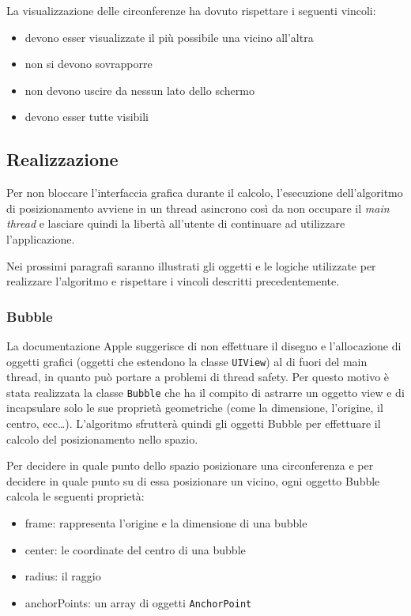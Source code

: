 La visualizzazione delle circonferenze ha dovuto rispettare i seguenti vincoli:

\begin{itemize}
 \item  devono esser visualizzate il più possibile una vicino all'altra
 \item  non si devono sovrapporre
 \item  non  devono uscire da nessun lato dello schermo 
 \item 	devono esser tutte visibili
\end{itemize}

\subsection{Realizzazione}

Per non bloccare l'interfaccia grafica durante il calcolo, l'esecuzione dell'algoritmo di posizionamento avviene in un thread asincrono così da non occupare il \emph{main thread} e lasciare quindi la libertà all'utente di continuare ad utilizzare l'applicazione.

Nei prossimi paragrafi saranno illustrati gli oggetti e le logiche utilizzate per realizzare l'algoritmo e rispettare i vincoli descritti precedentemente.

\subsubsection{Bubble}

La documentazione Apple suggerisce di non effettuare il disegno e l'allocazione di oggetti grafici (oggetti che estendono la classe \texttt{UIView}) al di fuori del main thread, in quanto può portare a problemi di thread safety. Per questo motivo è stata realizzata la classe \texttt{Bubble} che ha il compito di astrarre un oggetto view e di incapsulare solo le sue proprietà geometriche (come la dimensione, l'origine, il centro, ecc\dots). L'algoritmo sfrutterà quindi gli oggetti Bubble per effettuare il calcolo del posizionamento nello spazio.

Per decidere in quale punto dello spazio posizionare una circonferenza e per decidere in quale punto su di essa posizionare un vicino, ogni oggetto Bubble calcola le seguenti proprietà:
\begin{itemize}
 \item frame: rappresenta l'origine e la dimensione di una bubble
 \item center: le coordinate del centro di una bubble
 \item radius: il raggio
 \item anchorPoints: un array di oggetti \texttt{AnchorPoint}
\end{itemize}

